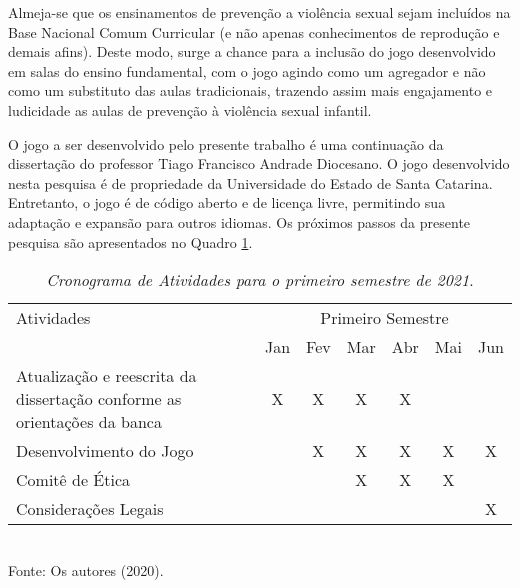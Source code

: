 Almeja-se que os ensinamentos de prevenção a violência sexual sejam incluídos na Base Nacional Comum Curricular (e não apenas conhecimentos de reprodução e demais afins). Deste modo, surge a chance para a inclusão do jogo desenvolvido em salas do ensino fundamental, com o jogo agindo como um agregador e não como um substituto das aulas tradicionais, trazendo assim mais engajamento e ludicidade as aulas de prevenção à violência sexual infantil.
   

O jogo a ser desenvolvido pelo presente trabalho é uma continuação da dissertação do professor Tiago Francisco Andrade Diocesano. %
O jogo desenvolvido nesta pesquisa é de propriedade da Universidade do Estado de Santa Catarina. Entretanto, o jogo é de código aberto e de licença livre, permitindo sua adaptação e expansão para outros idiomas. Os próximos passos da presente pesquisa são apresentados no Quadro \ref{tabelinha}.

\captionsetup[table]{name=Quadro}
\begin{table}[!htb]
    \centering
    \renewcommand{\arraystretch}{1.5} %
    \caption{\emph{Cronograma de Atividades para o primeiro semestre de 2021}.}\label{tabelinha}
    \vspace{0.2cm}
    \begin{tabular}{|p{8cm}|c|c|c|c|c|c|}
    \hline
    Atividades & \multicolumn{6}{|c|}{Primeiro Semestre} \\
    \cline{2-7}                                                                             & Jan   & Fev   & Mar   & Abr   & Mai   & Jun   \\
    \hline Atualização e reescrita da dissertação conforme as orientações da banca          & X     & X     & X     & X     &       &       \\
    \hline Desenvolvimento do Jogo                                                          &       & X     & X     & X     & X     & X     \\
    \hline Comitê de Ética                                                                  &       &       & X     & X     & X     &      \\
    \hline Considerações Legais                                                             &       &       &       &       &       & X     \\
    \hline
    \end{tabular} 
    \\
    Fonte: Os autores (2020).
\end{table}

